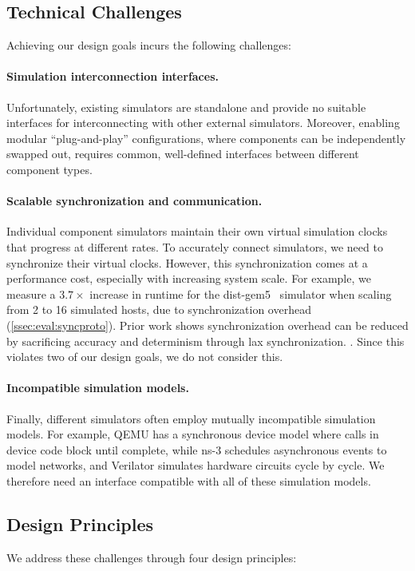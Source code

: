 \subsection{Technical Challenges}
Achieving our design goals incurs the following challenges:

\paragraph{Simulation interconnection interfaces.}
Unfortunately, existing simulators are standalone and provide no suitable
interfaces for interconnecting with other external simulators.
%
Moreover, enabling modular ``plug-and-play'' configurations, where
components can be independently swapped out, requires common,
well-defined interfaces between different component types.

\paragraph{Scalable synchronization and communication.}
Individual component simulators maintain their own virtual simulation
clocks that progress at different rates.
%
To accurately connect simulators, we need to synchronize their virtual
clocks.
%
However, this synchronization comes at a performance cost, especially
with increasing system scale.
%
For example, we measure a $3.7\times$ increase in runtime for the
dist-gem5~\cite{mohammad:distgem5} simulator when scaling from 2 to 16
simulated hosts, due to synchronization overhead
(\autoref{ssec:eval:syncproto}).
%
Prior work shows synchronization overhead can be reduced by
sacrificing accuracy and determinism through lax synchronization.
\cite{fujimoto:relaxedsim,chen:slacksim}.
%
Since this violates two of our design goals, we do not consider this.

\paragraph{Incompatible simulation models.}
Finally, different simulators often employ mutually incompatible
simulation models.
%
For example, QEMU has a synchronous device model where calls in device
code block until complete, while ns-3 schedules asynchronous events
to model networks, and Verilator simulates hardware circuits cycle by
cycle.
%
We therefore need an interface compatible with all of these simulation
models.

\subsection{Design Principles}
We address these challenges through four design principles:

